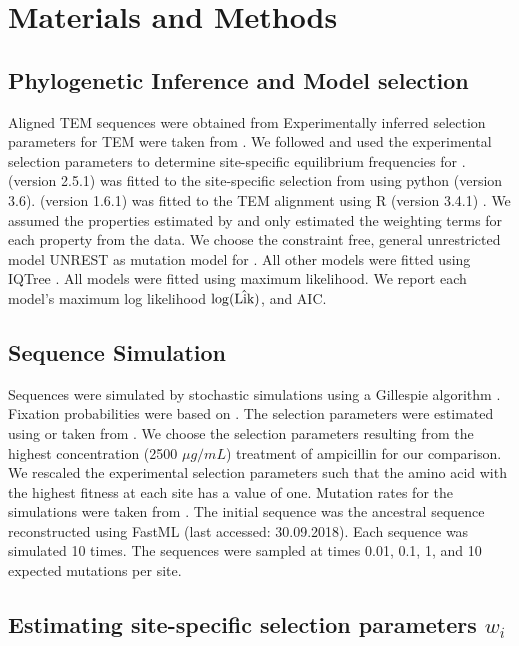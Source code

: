 \documentclass[fleqn,letterpaper]{article}
\begin{document}
\section{Materials and Methods}

\subsection{Phylogenetic Inference and Model selection}

Aligned TEM sequences were obtained from \citet{bloom2017}
Experimentally inferred selection parameters for TEM were taken from \citet{stiffler2016}.
We followed \citep{bloom2017} and used the experimental selection parameters to determine site-specific equilibrium frequencies for \phydms. 
\phydms (version 2.5.1) was fitted to the site-specific selection from \citet{stiffler2016} using python (version 3.6).
\selac (version 1.6.1) was fitted to the TEM alignment using R (version 3.4.1) \citep{rcore}.
We assumed the \PC properties estimated by \citet{grantham1974} and only estimated the weighting terms for each property from the data.
We choose the constraint free, general unrestricted model UNREST \citep{Yang1994} as mutation model for \selac.
All other models were fitted using IQTree \citep{nguyen2015}.
All models were fitted using maximum likelihood.
We report each model's maximum log likelihood $\log(\hat{\text{Lik}})$, and AIC.


\subsection{Sequence Simulation}

Sequences were simulated by stochastic simulations using a Gillespie algorithm \citep{gillespie1976}.
Fixation probabilities were based on \citet{SellaAndHirsh2005}.
The selection parameters were estimated using \selac or taken from \citet{stiffler2016}.
We choose the selection parameters resulting from the highest concentration (2500 $\mu g/mL$) treatment of ampicillin for our comparison.
We rescaled the experimental selection parameters such that the amino acid with the highest fitness at each site has a value of one.
Mutation rates for the simulations were taken from \selac.
The initial sequence was the ancestral sequence reconstructed using FastML \citep{fastml} (last accessed: 30.09.2018).
Each sequence was simulated 10 times. 
The sequences were sampled at times 0.01, 0.1, 1, and 10 expected mutations per site.

\subsection{Estimating site-specific selection parameters $w_i$}
\end{document}
